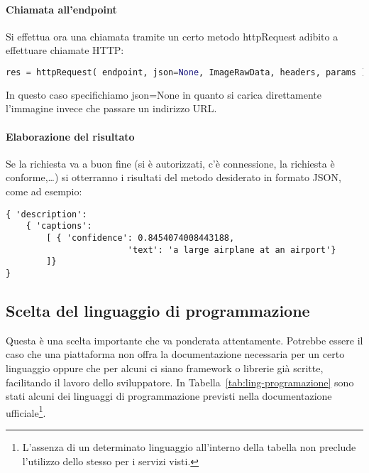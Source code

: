 \paragraph{Chiamata all'endpoint}
Si effettua ora una chiamata tramite un certo metodo \textsf{httpRequest} adibito a
effettuare chiamate HTTP:
%
\begin{lstlisting}[language=Python,style=mystyle]
res = httpRequest( endpoint, json=None, ImageRawData, headers, params )
\end{lstlisting}
In questo caso specifichiamo \textsf{json=None} in quanto si carica direttamente l'immagine
invece che passare un indirizzo URL.
%
\paragraph{Elaborazione del risultato}
Se la richiesta va a buon fine (si è autorizzati, c'è connessione, la richiesta è conforme,\ldots)
si otterranno i risultati del metodo desiderato in formato JSON, come ad esempio:
\begin{lstlisting}[style=myJSON]
{ 'description':
	{ 'captions':
		[ { 'confidence': 0.8454074008443188,
						'text': 'a large airplane at an airport'}
		]}
}
\end{lstlisting}
%
\subsection{Scelta del linguaggio di programmazione}\label{subsec:scelta-linguaggio}
Questa è una scelta importante che va ponderata attentamente.
Potrebbe essere il caso che una piattaforma non offra la documentazione necessaria
per un certo linguaggio oppure che per alcuni ci siano framework o librerie
già scritte, facilitando il lavoro dello sviluppatore.
In Tabella~\ref{tab:ling-programazione} sono stati alcuni dei linguaggi
di programmazione previsti nella documentazione ufficiale\footnote{L'assenza di un determinato linguaggio
all'interno della tabella non preclude l'utilizzo dello stesso per i servizi visti.}.

